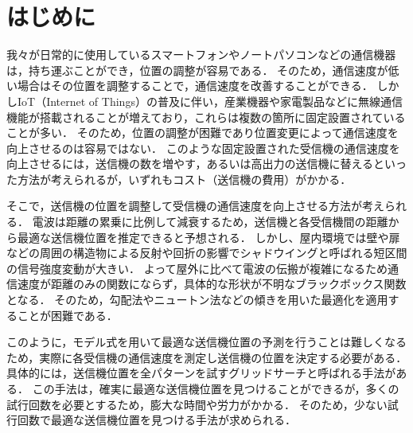 \documentclass[twocolumn]{ltjarticle}
\begin{document}



\section{はじめに}
我々が日常的に使用しているスマートフォンやノートパソコンなどの通信機器は，持ち運ぶことができ，位置の調整が容易である．
そのため，通信速度が低い場合はその位置を調整することで，通信速度を改善することができる．
しかしIoT（Internet of Things）の普及に伴い，産業機器や家電製品などに無線通信機能が搭載されることが増えており，これらは複数の箇所に固定設置されていることが多い\cite{soumu}．
そのため，位置の調整が困難であり位置変更によって通信速度を向上させるのは容易ではない．
このような固定設置された受信機の通信速度を向上させるには，送信機の数を増やす，あるいは高出力の送信機に替えるといった方法が考えられるが，いずれもコスト（送信機の費用）がかかる．

そこで，送信機の位置を調整して受信機の通信速度を向上させる方法が考えられる．
電波は距離の累乗に比例して減衰するため，送信機と各受信機間の距離から最適な送信機位置を推定できると予想される．
しかし、屋内環境では壁や扉などの周囲の構造物による反射や回折の影響でシャドウイングと呼ばれる短区間の信号強度変動が大きい．
よって屋外に比べて電波の伝搬が複雑になるため通信速度が距離のみの関数にならず，具体的な形状が不明なブラックボックス関数となる．
そのため，勾配法やニュートン法などの傾きを用いた最適化を適用することが困難である．

このように，モデル式を用いて最適な送信機位置の予測を行うことは難しくなるため，実際に各受信機の通信速度を測定し送信機の位置を決定する必要がある．
具体的には，送信機位置を全パターンを試すグリッドサーチと呼ばれる手法がある．
この手法は，確実に最適な送信機位置を見つけることができるが，多くの試行回数を必要とするため，膨大な時間や労力がかかる．
そのため，少ない試行回数で最適な送信機位置を見つける手法が求められる．
\end{document}
